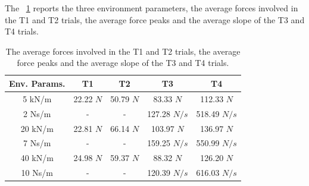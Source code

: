\documentclass[journal]{IEEEtran}
\begin{document}
\par The \tablename \ \ref{tab:meanForcesRendering} reports the three environment parameters, the average forces involved in the T1 and T2 trials, the average force peaks and the average slope of the T3 and T4 trials.
\begin{table}[]
	\renewcommand{\arraystretch}{1.3}
	\caption{The average forces involved in the T1 and T2 trials, the average force peaks and the average slope of the T3 and T4 trials.}
	\label{tab:meanForcesRendering}
	\centering
	\begin{tabular}{c c c c c}
		\hline \hline
		\bfseries Env. Params. & \bfseries T1 & \bfseries T2 & \bfseries T3 & \bfseries T4 \\
		\hline
		5 kN/m  &  22.22 $N$ & 50.79 $N$ & 83.33 $N$ & 112.33 $N$\\ 2 Ns/m & - & - & 127.28 $N/s$ & 518.49 $N/s$\\ 
		\hline
		20 kN/m &  22.81 $N$ & 66.14 $N$ & 103.97 $N$ & 136.97 $N$\\ 7 Ns/m & - & - & 159.25 $N/s$ & 550.99 $N/s$\\
		\hline
		40 kN/m  &  24.98 $N$ & 59.37 $N$ & 88.32 $N$ & 126.20 $N$\\ 10 Ns/m & - & - & 120.39 $N/s$ & 616.03 $N/s$\\
		\hline \hline
	\end{tabular}
\end{table}
\end{document}
